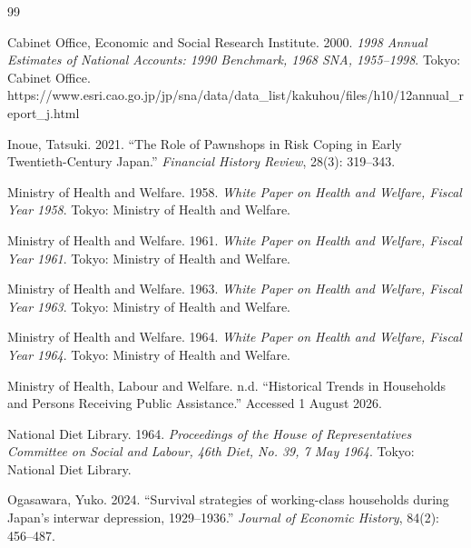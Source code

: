 \documentclass[12pt]{article}
\begin{document}
\newpage

\begin{thebibliography}{99}

Cabinet Office, Economic and Social Research Institute. 2000.
\newblock \textit{1998 Annual Estimates of National Accounts: 1990 Benchmark,
  1968 SNA, 1955--1998}.
\newblock Tokyo: Cabinet Office.
\newblock https://www.esri.cao.go.jp/jp/sna/data/data\_list/kakuhou/files/h10/12annual\_report\_j.html

Inoue, Tatsuki. 2021.
\newblock ``The Role of Pawnshops in Risk Coping in Early Twentieth-Century
  Japan.''
\newblock \textit{Financial History Review}, 28(3): 319--343.

Ministry of Health and Welfare. 1958.
\newblock \textit{White Paper on Health and Welfare, Fiscal Year 1958}.
\newblock Tokyo: Ministry of Health and Welfare.

Ministry of Health and Welfare. 1961.
\newblock \textit{White Paper on Health and Welfare, Fiscal Year 1961}.
\newblock Tokyo: Ministry of Health and Welfare.

Ministry of Health and Welfare. 1963.
\newblock \textit{White Paper on Health and Welfare, Fiscal Year 1963}.
\newblock Tokyo: Ministry of Health and Welfare.

Ministry of Health and Welfare. 1964.
\newblock \textit{White Paper on Health and Welfare, Fiscal Year 1964}.
\newblock Tokyo: Ministry of Health and Welfare.

Ministry of Health, Labour and Welfare. n.d.
\newblock ``Historical Trends in Households and Persons Receiving Public
  Assistance.''
\newblock Accessed 1 August 2026.

National Diet Library. 1964.
\newblock \textit{Proceedings of the House of Representatives Committee on
  Social and Labour, 46th Diet, No. 39, 7 May 1964}.
\newblock Tokyo: National Diet Library.

Ogasawara, Yuko. 2024.
\newblock ``Survival strategies of working-class households during Japan's
  interwar depression, 1929--1936.''
\newblock \textit{Journal of Economic History}, 84(2): 456--487.


\end{thebibliography}
\end{document}
